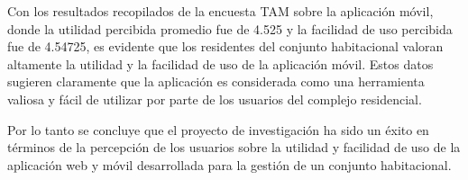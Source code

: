 Con los resultados recopilados de la encuesta TAM sobre la aplicación móvil, donde la utilidad percibida promedio fue de 4.525 y la facilidad de uso percibida fue de 4.54725, es evidente que los residentes del conjunto habitacional valoran altamente la utilidad y la facilidad de uso de la aplicación móvil. Estos datos sugieren claramente que la aplicación es considerada como una herramienta valiosa y fácil de utilizar por parte de los usuarios del complejo residencial.


Por lo tanto se concluye que el proyecto de investigación ha sido un éxito en términos de la percepción de los usuarios sobre la utilidad y facilidad de uso de la aplicación web y móvil desarrollada para la gestión de un conjunto habitacional.

